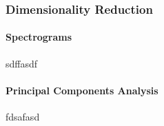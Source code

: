\subsubsection{Dimensionality Reduction}
\paragraph{Spectrograms}
	sdffasdf
\paragraph{Principal Components Analysis}
	fdsafasd